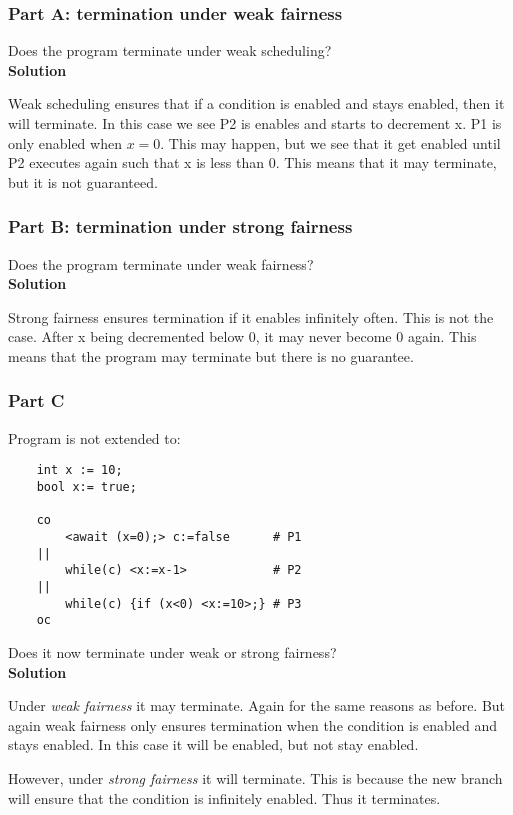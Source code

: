 \subsubsection{Part A: termination under weak fairness}

Does the program terminate under weak scheduling? \\

\textbf{Solution}

Weak scheduling ensures that if a condition is enabled and stays enabled, then it will terminate. 
In this case we see P2 is enables and starts to decrement x. P1 is only enabled when $x=0$. This may happen, but we see that it get enabled until P2 executes again such that x is less than 0.
This means that it may terminate, but it is not guaranteed.

\subsubsection{Part B: termination under strong fairness}

Does the program terminate under weak fairness? \\

\textbf{Solution}

Strong fairness ensures termination if it enables infinitely often. This is not the case. After x being decremented below 0, it may never become 0 again. 
This means that the program may terminate but there is no guarantee. 


\subsubsection{Part C}

Program is not extended to:

\begin{lstlisting}
    int x := 10;
    bool x:= true;

    co 
        <await (x=0);> c:=false      # P1
    ||
        while(c) <x:=x-1>            # P2
    ||
        while(c) {if (x<0) <x:=10>;} # P3
    oc
\end{lstlisting}

Does it now terminate under weak or strong fairness? \\ 


\textbf{Solution}

Under \textit{weak fairness} it may terminate. Again for the same reasons as before. But again weak fairness only ensures termination when the condition is enabled and stays enabled.
In this case it will be enabled, but not stay enabled. 

However, under \textit{strong fairness} it will terminate. This is because the new branch will ensure that the condition is infinitely enabled. 
Thus it terminates. 
